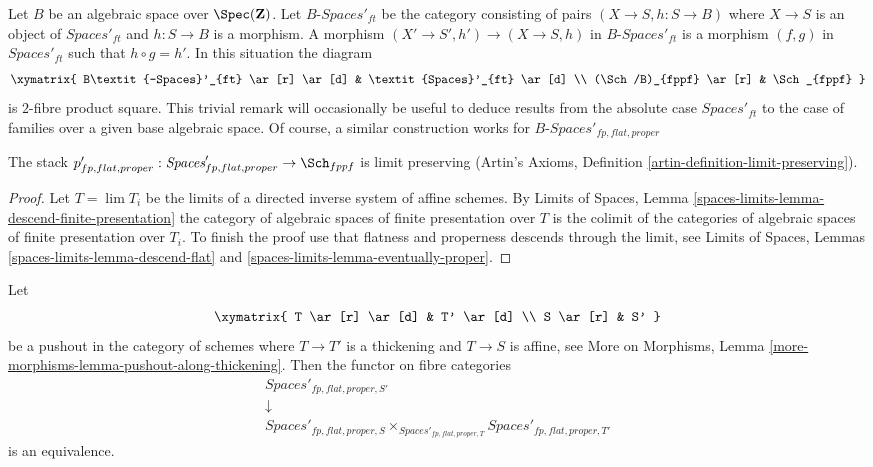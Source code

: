 \begin{remark}
\label{remark-spaces-base-change}
Let $B$ be an algebraic space over $\Spec(\mathbf{Z})$.
Let $B\textit{-Spaces}'_{ft}$ be the category consisting
of pairs $(X \to S, h : S \to B)$
where $X \to S$ is an object of
$\textit{Spaces}'_{ft}$ and $h : S \to B$ is a morphism.
A morphism $(X' \to S', h') \to (X \to S, h)$
in $B\textit{-Spaces}'_{ft}$ is a morphism $(f, g)$
in $\textit{Spaces}'_{ft}$ such that $h \circ g = h'$.
In this situation the diagram
$$
\xymatrix{
B\textit{-Spaces}'_{ft} \ar[r] \ar[d] & \textit{Spaces}'_{ft} \ar[d] \\
(\Sch/B)_{fppf} \ar[r] & \Sch_{fppf}
}
$$
is $2$-fibre product square. This trivial remark
will occasionally be useful to deduce results from
the absolute case $\textit{Spaces}'_{ft}$ to the case
of families over a given base algebraic space.
Of course, a similar construction works for
$B\textit{-Spaces}'_{fp, flat, proper}$
\end{remark}

\begin{lemma}
\label{lemma-spaces-limits}
The stack
$p'_{fp, flat, proper} :
\textit{Spaces}'_{fp, flat, proper} \to \Sch_{fppf}$ is limit preserving
(Artin's Axioms, Definition \ref{artin-definition-limit-preserving}).
\end{lemma}

\begin{proof}
Let $T = \lim T_i$ be the limits of a
directed inverse system of affine schemes.
By Limits of Spaces, Lemma
\ref{spaces-limits-lemma-descend-finite-presentation}
the category of algebraic spaces of finite presentation
over $T$ is the colimit of the categories of algebraic spaces
of finite presentation over $T_i$.
To finish the proof use that flatness and properness
descends through the limit, see
Limits of Spaces, Lemmas
\ref{spaces-limits-lemma-descend-flat} and
\ref{spaces-limits-lemma-eventually-proper}.
\end{proof}

\begin{lemma}
\label{lemma-spaces-RS-star}
Let
$$
\xymatrix{
T \ar[r] \ar[d] & T' \ar[d] \\
S \ar[r] & S'
}
$$
be a pushout in the category of schemes where
$T \to T'$ is a thickening and $T \to S$ is affine, see
More on Morphisms, Lemma \ref{more-morphisms-lemma-pushout-along-thickening}.
Then the functor on fibre categories
$$
\begin{matrix}
\textit{Spaces}'_{fp, flat, proper, S'} \\
\downarrow \\
\textit{Spaces}'_{fp, flat, proper, S}
\times_{\textit{Spaces}'_{fp, flat, proper, T}}
\textit{Spaces}'_{fp, flat, proper, T'}
\end{matrix}
$$
is an equivalence.
\end{lemma}

